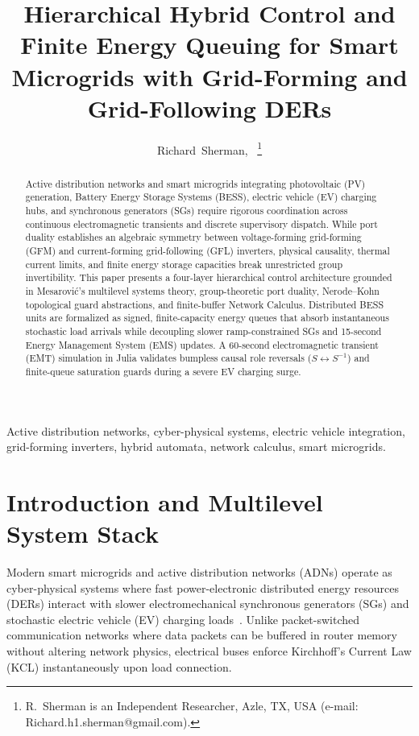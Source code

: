 \documentclass[journal]{IEEEtran}
\title{Hierarchical Hybrid Control and Finite Energy Queuing for Smart Microgrids with Grid-Forming and Grid-Following DERs}
\author{Richard~Sherman,~\IEEEmembership{Independent~Researcher}%
\thanks{R.~Sherman is an Independent Researcher, Azle, TX, USA (e-mail: Richard.h1.sherman@gmail.com).}}
\begin{document}
\maketitle

\begin{abstract}
Active distribution networks and smart microgrids integrating photovoltaic (PV) generation, Battery Energy Storage Systems (BESS), electric vehicle (EV) charging hubs, and synchronous generators (SGs) require rigorous coordination across continuous electromagnetic transients and discrete supervisory dispatch. While port duality establishes an algebraic symmetry between voltage-forming grid-forming (GFM) and current-forming grid-following (GFL) inverters, physical causality, thermal current limits, and finite energy storage capacities break unrestricted group invertibility. This paper presents a four-layer hierarchical control architecture grounded in Mesarovi\'{c}'s multilevel systems theory, group-theoretic port duality, Nerode--Kohn topological guard abstractions, and finite-buffer Network Calculus. Distributed BESS units are formalized as signed, finite-capacity energy queues that absorb instantaneous stochastic load arrivals while decoupling slower ramp-constrained SGs and 15-second Energy Management System (EMS) updates. A 60-second electromagnetic transient (EMT) simulation in Julia validates bumpless causal role reversals ($S \leftrightarrow S^{-1}$) and finite-queue saturation guards during a severe EV charging surge.
\end{abstract}

\begin{IEEEkeywords}
Active distribution networks, cyber-physical systems, electric vehicle integration, grid-forming inverters, hybrid automata, network calculus, smart microgrids.
\end{IEEEkeywords}

\section{Introduction and Multilevel System Stack}
Modern smart microgrids and active distribution networks (ADNs) operate as cyber-physical systems where fast power-electronic distributed energy resources (DERs) interact with slower electromechanical synchronous generators (SGs) and stochastic electric vehicle (EV) charging loads~\cite{Li2022Duality,Mesarovic1970}. Unlike packet-switched communication networks where data packets can be buffered in router memory without altering network physics, electrical buses enforce Kirchhoff's Current Law (KCL) instantaneously upon load connection.
\end{document}
